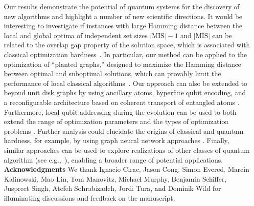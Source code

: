 \documentclass[twocolumn,amssymb,secnumarabic, prl, aps, nofootinbib]{revtex4-1}
\begin{document}
Our results demonstrate the potential of quantum systems for the discovery of new algorithms and highlight a number of new scientific directions. 
It would be interesting to investigate if instances with large Hamming distance between the local and global optima of independent set sizes $|\text{MIS}|-1$ and $|\text{MIS}|$ can be related to the overlap gap property of the solution space, which is associated with classical optimization hardness~\cite{Gamarnik_OGP}. In particular, our method can be applied to the optimization of   ``planted graphs,'' designed to maximize the Hamming distance between optimal and suboptimal solutions, which can provably limit the performance of local classical algorithms~\cite{GZ2019planted}. 
Our approach can also be extended to beyond unit disk graphs by using ancillary atoms, hyperfine qubit encoding, and a reconfigurable architecture based on coherent transport of entangled atoms \cite{bluvstein2021quantum}. Furthermore, local qubit addressing during the evolution can be used to both extend the range of optimization parameters and the types of optimization problems \cite{Lucas_Ising_Formulation}.  Further analysis could elucidate the origins of classical and quantum hardness, for example, by using  graph neural network approaches \cite{sohrabizadeh2021enabling}.   Finally, similar approaches can be used to explore realizations of other classes of quantum algorithm (see e.g.,~\cite{wild_quantum_2020}), enabling a broader range of potential applications.  \\



\textbf{Acknowledgments} We thank Ignacio Cirac, Jason Cong, Simon Evered, Marcin Kalinowski, Mao Lin, Tom Manovitz, Michael Murphy, Benjamin Schiffer, Juspreet Singh, Atefeh Sohrabizadeh, Jordi Tura, and Dominik Wild for illuminating discussions and feedback on the manuscript.
\end{document}

